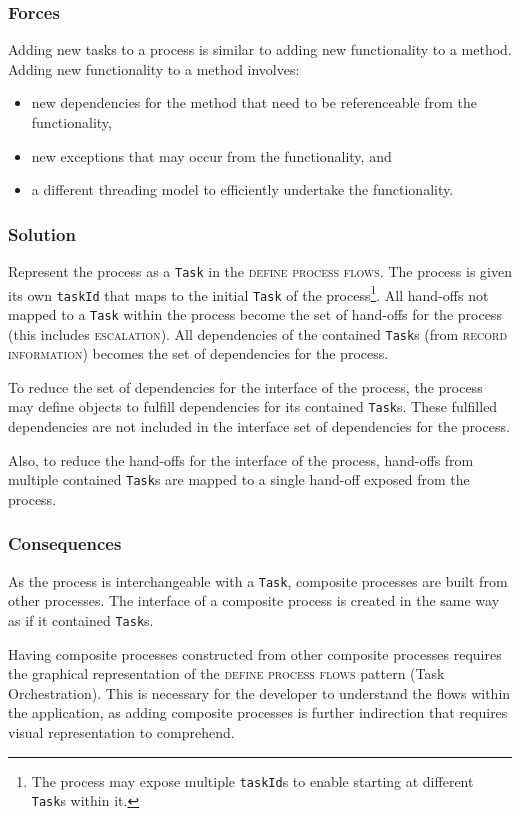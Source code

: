 \documentclass[prodmode]{style/acmlarge}
\begin{document}
\subsubsection*{Forces} Adding new tasks to a process is similar to adding new
functionality to a method.  Adding new functionality to a method involves:
\begin{itemize}
  \item new dependencies for the method that need to be referenceable from the functionality,
  \item new exceptions that may occur from the functionality, and
  \item a different threading model to efficiently undertake the functionality. 
\end{itemize}

\subsubsection*{Solution} Represent the process as a \texttt{Task} in the
\textsc{define process flows}.  The process is given its own \texttt{taskId}
that maps to the initial \texttt{Task} of the process\footnote{The process may
expose multiple \texttt{taskId}s to enable starting at different \texttt{Task}s
within it.}.  All hand-offs not mapped to a \texttt{Task} within the process
become the set of hand-offs for the process (this includes \textsc{escalation}).
All dependencies of the contained \texttt{Task}s (from \textsc{record
information}) becomes the set of dependencies for the process.

To reduce the set of dependencies for the interface of the process, the process
may define objects to fulfill dependencies for its contained \texttt{Task}s.  These
fulfilled dependencies are not included in the interface set of dependencies for
the process.

Also, to reduce the hand-offs for the interface of the process, hand-offs
from multiple contained \texttt{Task}s are mapped to a single hand-off exposed
from the process.

\subsubsection*{Consequences} As the process is interchangeable with a
\texttt{Task}, composite processes are built from other processes.  The
interface of a composite process is created in the same way as if it contained
\texttt{Task}s.

Having composite processes constructed from other composite processes requires
the graphical representation of the \textsc{define process flows} pattern (Task
Orchestration).  This is necessary for the developer to understand the flows
within the application, as adding composite processes is further indirection
that requires visual representation to comprehend.
\end{document}
